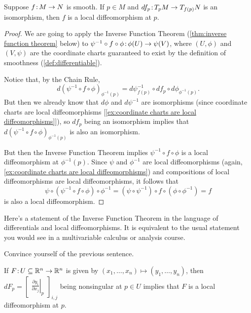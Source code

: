 \begin{proposition}\label{prop:local diffeomorphism}
	Suppose $f \colon\thinspace\!\! M \to N$ is smooth. If $p \in M$ and $df_p \colon\thinspace\!\! T_p M \to T_{f(p)}N$ is an isomorphism, then $f$ is a local diffeomorphism at $p$.
\end{proposition}

\begin{proof}
	We are going to apply the Inverse Function Theorem (\cref{thm:inverse function theorem} below) to $\psi^{-1} \circ f \circ \phi \colon\thinspace\!\! \phi(U) \to \psi(V)$, where $(U,\phi)$ and $(V, \psi)$ are the coordinate charts guaranteed to exist by the definition of smoothness (\cref{def:differentiable}).
	
	Notice that, by the Chain Rule,
	\[
		d(\psi^{-1} \circ f \circ \phi)_{\phi^{-1}(p)} = d\psi^{-1}_{f(p)} \circ df_p \circ d\phi_{\phi^{-1}(p)}.
	\]
	But then we already know that $d\phi$ and $d\psi^{-1}$ are isomorphisms (since coordinate charts are local diffeomorphisms [\cref{ex:coordinate charts are local diffeomorphisms}]), so $df_p$ being an isomorphism implies that $d(\psi^{-1} \circ f \circ \phi)_{\phi^{-1}(p)}$ is also an isomorphism.
	
	But then the Inverse Function Theorem implies $\psi^{-1} \circ f \circ \phi$ is a local diffeomorphism at $\phi^{-1}(p)$. Since $\psi$ and $\phi^{-1}$ are local diffeomorphisms (again, \cref{ex:coordinate charts are local diffeomorphisms}) and compositions of local diffeomorphisms are local diffeomorphisms, it follows that
	\[
		\psi \circ (\psi^{-1} \circ f \circ \phi) \circ \phi^{-1} = (\psi \circ \psi^{-1}) \circ f \circ (\phi \circ \phi^{-1}) = f
	\]
	is also a local diffeomorphism.
\end{proof}

Here's a statement of the Inverse Function Theorem in the language of differentials and local diffeomorphisms. It is equivalent to the usual statement you would see in a multivariable calculus or analysis course.

\begin{exercise}
	Convince yourself of the previous sentence.
\end{exercise}

\begin{theorem}\label{thm:inverse function theorem}
	If $F \colon\thinspace\!\! U \subseteq \mathbb{R}^n \to \mathbb{R}^n$ is given by $(x_1, \dots , x_n) \mapsto (y_1, \dots , y_n)$, then $dF_p = \begin{bmatrix} \left.\frac{\partial y_i}{\partial x_j}\right|_p\end{bmatrix}_{i,j}$ being nonsingular at $p \in U$ implies that $F$ is a local diffeomorphism at $p$.
\end{theorem}

